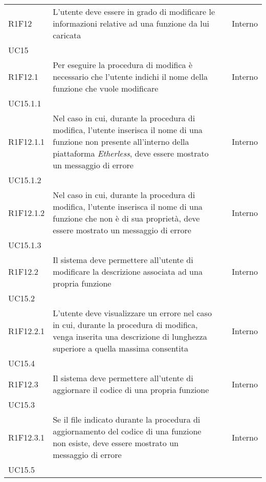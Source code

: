 \begin{longtable}{ 
		>{\centering}p{} 
		>{}p{} 
		>{\centering}p{}
		>{\centering}p{} }
	R1F12 & L'utente deve essere in grado di modificare le informazioni relative 
		ad una funzione da lui caricata 											& \ob & Interno \\ UC15 \tabularnewline
	R1F12.1 & Per eseguire la procedura di modifica è necessario che l'utente 
		indichi il nome della funzione che vuole modificare 							& \ob & Interno \\ UC15.1.1 \tabularnewline
	R1F12.1.1 & Nel caso in cui, durante la procedura di modifica, l'utente 
		inserisca il nome di una funzione non presente all'interno della piattaforma
		\textit{Etherless}, deve essere mostrato un messaggio di errore				& \ob & Interno \\ UC15.1.2 \tabularnewline
	R1F12.1.2 & Nel caso in cui, durante la procedura di modifica, l'utente 
		inserisca il nome di una funzione che non è di sua proprietà, deve essere 
		mostrato un messaggio di errore												& \ob & Interno \\ UC15.1.3 \tabularnewline
	R1F12.2 & Il sistema deve permettere all'utente di modificare la descrizione 
		associata ad una propria funzione 											& \ob & Interno \\ UC15.2 \tabularnewline
	R1F12.2.1 & L'utente deve visualizzare un errore nel caso in cui, durante 
		la procedura di modifica, venga inserita una descrizione di lunghezza
		superiore a quella massima consentita 										& \ob & Interno \\ UC15.4 \tabularnewline
	R1F12.3 & Il sistema deve permettere all'utente di aggiornare il codice di 
		una propria funzione 														& \ob & Interno \\ UC15.3 \tabularnewline	
	R1F12.3.1 & Se il file indicato durante la procedura di aggiornamento del 
		codice di una funzione non esiste, deve essere mostrato un messaggio di 
		errore																		& \ob & Interno \\ UC15.5 \tabularnewline
		

\end{longtable}
